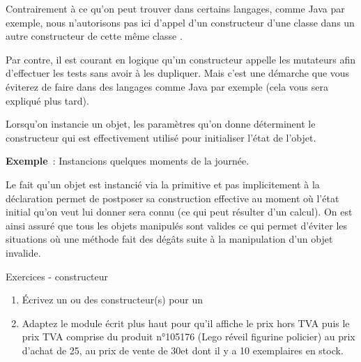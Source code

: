 
	Contrairement à ce qu'on peut trouver dans certains langages, 
	comme Java par exemple, nous n'autorisons pas ici d'appel 
	d'un constructeur d'une classe  dans un autre constructeur 
	de cette même classe .
	
	Par contre, il est courant en logique qu'un constructeur 
	appelle les mutateurs afin d'effectuer les tests sans 
	avoir à les dupliquer.
	Mais c'est une démarche que vous éviterez de faire dans
	des langages comme Java par exemple 
	(cela vous sera expliqué plus tard).
	
	Lorsqu'on instancie un objet, les paramètres
	qu'on donne déterminent le constructeur qui est
	effectivement utilisé pour initialiser l'état de
	l'objet.

	\textbf{Exemple}~: Instancions quelques moments de la journée.
	

	Le fait qu'un objet est instancié via la primitive
	 et pas implicitement à la déclaration permet de
	postposer sa construction effective au moment où
	l'état initial qu'on veut lui donner
	sera connu (ce qui peut résulter d'un calcul). On est
	ainsi assuré que tous les objets manipulés sont valides ce qui permet
	d’éviter les situations où une méthode fait des dégâts suite à la
	manipulation d’un objet invalide.
	
	\begin{Emphase}{Exercices - constructeur}
		\remonter
		\begin{enumerate}
			\item {
				Écrivez un ou des constructeur(s) pour un }
			\item {
				Adaptez le module écrit plus haut pour qu'il affiche le prix hors TVA
				puis le prix TVA comprise du produit n°105176 (Lego réveil figurine policier)
				au prix d'achat de 25\texteuro, au prix de vente de 30\texteuro et 
				dont il y a 10 exemplaires en stock.}
		\end{enumerate}
	\end{Emphase}

